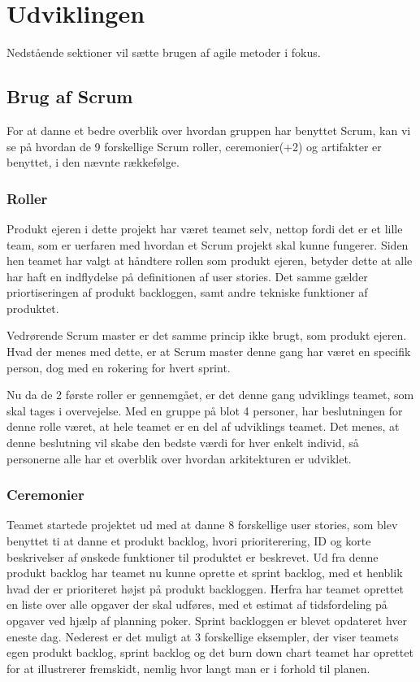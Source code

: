 \chapter{Udviklingen}\label{ch:Udviklingen}

Nedstående sektioner vil sætte brugen af agile metoder i fokus. 

\section{Brug af Scrum}

For at danne et bedre overblik over hvordan gruppen har benyttet Scrum, kan vi se på hvordan de 9 forskellige Scrum roller, ceremonier(+2) og artifakter er benyttet, i den nævnte rækkefølge.

\subsection{Roller}

Produkt ejeren i dette projekt har været teamet selv, nettop fordi det er et lille team, som er uerfaren med hvordan et Scrum projekt skal kunne fungerer. Siden hen teamet har valgt at håndtere rollen som produkt ejeren, betyder dette at alle har haft en indflydelse på definitionen af user stories. Det samme gælder priortiseringen af produkt backloggen, samt andre tekniske funktioner af produktet. 

Vedrørende Scrum master er det samme princip ikke brugt, som produkt ejeren. Hvad der menes med dette, er at Scrum master denne gang har været en specifik person, dog med en rokering for hvert sprint. 

Nu da de 2 første roller er gennemgået, er det denne gang udviklings teamet, som skal tages i overvejelse. Med en gruppe på blot 4 personer, har beslutningen for denne rolle været, at hele teamet er en del af udviklings teamet. Det menes, at denne beslutning vil skabe den bedste værdi for hver enkelt individ, så personerne alle har et overblik over hvordan arkitekturen er udviklet. 



\subsection{Ceremonier}

Teamet startede projektet ud med at danne 8 forskellige user stories, som blev benyttet ti at danne et produkt backlog, hvori prioriterering, ID og korte beskrivelser af ønskede funktioner til produktet er beskrevet. Ud fra denne produkt backlog har teamet nu kunne oprette et sprint backlog, med et henblik hvad der er prioriteret højst på produkt backloggen. Herfra har teamet oprettet en liste over alle opgaver der skal udføres, med et estimat af tidsfordeling på opgaver ved hjælp af planning poker. Sprint backloggen er blevet opdateret hver eneste dag. Nederest er det muligt at 3 forskellige eksempler, der viser teamets egen produkt backlog, sprint backlog og det burn down chart teamet har oprettet for at illustrerer fremskidt, nemlig hvor langt man er i forhold til planen. 

